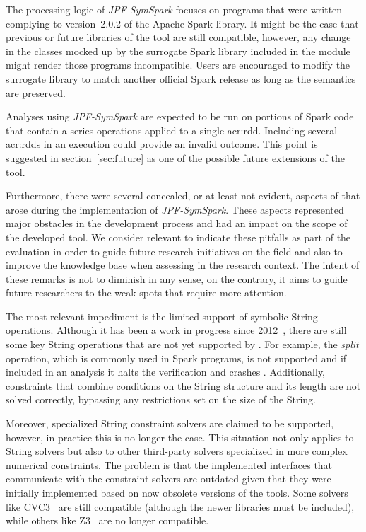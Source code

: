 The processing logic of \textit{JPF-SymSpark} focuses on programs that were written complying to version~2.0.2 of the Apache Spark library. It might be the case that previous or future libraries of the tool are still compatible, however, any change in the classes mocked up by the surrogate Spark library included in the module might render those programs incompatible. Users are encouraged to modify the surrogate library to match another official Spark release as long as the semantics are preserved.

Analyses using \textit{JPF-SymSpark} are expected to be run on portions of Spark code that contain a series operations applied to a single \acrshort{acr:rdd}. Including several \acrshort{acr:rdd}s in an execution could provide an invalid outcome. This point is suggested in section~\ref{sec:future} as one of the possible future extensions of the tool.

Furthermore, there were several concealed, or at least not evident, aspects of \spf{} that arose during the implementation of \textit{JPF-SymSpark}. These aspects represented major obstacles in the development process and had an impact on the scope of the developed tool. We consider relevant to indicate these pitfalls as part of the evaluation in order to guide future research initiatives on the field and also to improve the knowledge base when assessing \spf{} in the research context. The intent of these remarks is not to diminish \spf{} in any sense, on the contrary, it aims to guide future researchers to the weak spots that require more attention.

The most relevant impediment is the limited support of symbolic String operations. Although it has been a work in progress since 2012~\cite{Redelinghuys2012,Pasareanu2013}, there are still some key String operations that are not yet supported by \spf{}. For example, the \textit{split} operation, which is commonly used in Spark programs, is not supported and if included in an analysis it halts the verification and crashes \jpf{}. Additionally, constraints that combine conditions on the String structure and its length are not solved correctly, bypassing any restrictions set on the size of the String.

Moreover, specialized String constraint solvers are claimed to be supported, however, in practice this is no longer the case. This situation not only applies to String solvers but also to other third-party solvers specialized in more complex numerical constraints. The problem is that the implemented interfaces that communicate with the constraint solvers are outdated given that they were initially implemented based on now obsolete versions of the tools. Some solvers like CVC3~\cite{Barrett2007} are still compatible (although the newer libraries must be included), while others like Z3~\cite{DeMoura2008} are no longer compatible.

